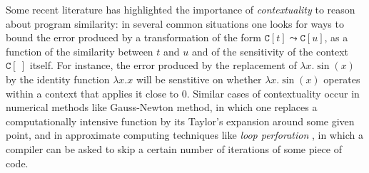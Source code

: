   

 
  
% 
%  
%
%
% 
% 
%  

Some recent literature \cite{chaudhuri, dallago:differential-stlc} has highlighted the importance of \emph{contextuality} to reason about program similarity: in several common situations one looks for ways to bound the error produced by a transformation of the form $\mathtt C[t] \leadsto \mathtt C[u]$, as a function of the similarity between $t$ and $u$ and of the sensitivity of the context $\mathtt C[\ ]$ itself.
%
%
%
%
%
  For instance, the error produced by the replacement of $\lambda x.\sin(x)$ by the identity function $\lambda x.x$ 
will be senstitive on whether
$\lambda x.\sin(x)$
operates within a context that applies it close to $0$.
 Similar cases of contextuality occur in numerical methods like Gauss-Newton method, in which one replaces a 
 computationally intensive function by its Taylor's expansion {around some given point}, and in {approximate computing} techniques like \emph{loop perforation} \cite{loopperf}, in which a compiler can be asked to skip a certain number of iterations of some piece of code.
 

% 
% 
% 
 

